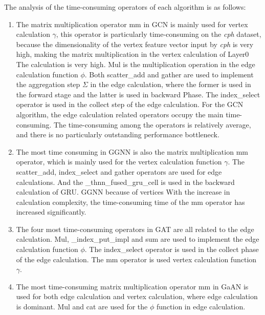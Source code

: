 The analysis of the time-consuming operators of each algorithm is as follows:

\begin{enumerate}
    \item The matrix multiplication operator mm in GCN is mainly used for vertex calculation $\gamma$,
          this operator is particularly time-consuming on the \textit{cph} dataset,
          because the dimensionality of the vertex feature vector input by \textit{cph} is very high,
          making the matrix multiplication in the vertex calculation of Layer0 The calculation is very high.
          Mul is the multiplication operation in the edge calculation function $\phi$.
          Both scatter\_add and gather are used to implement the aggregation step $\Sigma$ in the edge calculation,
          where the former is used in the forward stage and the latter is used in backward Phase.
          The index\_select operator is used in the collect step of the edge calculation.
          For the GCN algorithm, the edge calculation related operators occupy the main time-consuming.
          The time-consuming among the operators is relatively average, and there is no particularly outstanding performance bottleneck.
    \item The most time consuming in GGNN is also the matrix multiplication mm operator,
          which is mainly used for the vertex calculation function $\gamma$. The scatter\_add, index\_select and gather operators
          are used for edge calculations. And the \_thnn\_fused\_gru\_cell is used in the backward calculation of GRU.
          GGNN because of vertices With the increase in calculation complexity, the time-consuming time of the mm operator has increased significantly.
    \item The four most time-consuming operators in GAT are all related to the edge calculation.
          Mul, \_index\_put\_impl and sum are used to implement the edge calculation function $\phi$.
          The index\_select operator is used in the collect phase of the edge calculation.
          The mm operator is used vertex calculation function $\gamma$.
    \item The most time-consuming matrix multiplication operator mm in GaAN is used for both edge calculation and vertex calculation,
          where edge calculation is dominant. Mul and cat are used for the $\phi$ function in edge calculation.
\end{enumerate}

